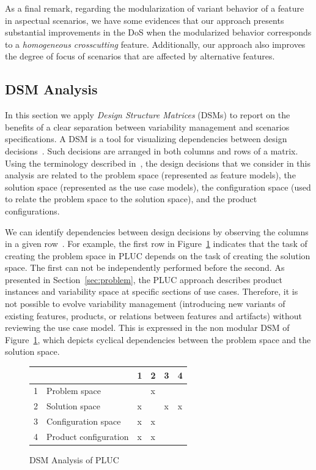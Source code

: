 \documentclass{acm_proc_article-sp}
\begin{document}
As a final remark, regarding the modularization of variant behavior of a feature
in aspectual scenarios, we have some evidences that our approach presents
substantial improvements in the DoS when the modularized behavior corresponds to
a \emph{homogeneous crosscutting} feature. Additionally, our approach also
improves the degree of focus of scenarios that are affected by alternative
features.


\subsection{DSM Analysis}

In this section we apply \emph{Design Structure Matrices} (DSMs) to report on the
benefits of a clear separation between variability management and scenarios
specifications. A DSM is a tool for visualizing dependencies between design
decisions~\cite{Baldwin:2000aa}. Such decisions are arranged in both columns and
rows of a matrix. Using the terminology described in~\cite{Czarnecki:2000aa}, the
design decisions that we consider in this analysis are related to the problem
space (represented as feature models), the solution space (represented as the use
case models), the configuration space (used to relate the problem space to the
solution space), and the product configurations.


 We can identify dependencies between design decisions by observing the columns
 in a given row~\cite{Baldwin:2000aa}. For example, the first row in
 Figure~\ref{dsm:pluc} indicates that the task of creating the problem space in
 PLUC depends on the task of creating the solution space. The first can not be
 independently performed before the second. As presented in
 Section~\ref{sec:problem}, the PLUC approach describes product instances and
 variability space at specific sections of use cases. Therefore, it is not
 possible to evolve variability management (introducing new variants of existing
 features, products, or relations between features and artifacts) without
 reviewing the use case model. This is expressed in the non modular DSM of
 Figure~\ref{dsm:pluc}, which depicts cyclical dependencies between the problem
 space and the solution space.


\begin{figure}[htb]
\centering
\begin{small}
\begin{tabular}{llllll} \hline
  &                         & 1 & 2 & 3 & 4 \\ \hline
1 & Problem space           &   & x &   &   \\
2 & Solution space          & x &   & x & x \\
3 & Configuration space     & x & x &   &   \\
4 & Product configuration   & x & x &   &   \\ \hline
\end{tabular}
\end{small}
\caption{DSM Analysis of PLUC}
\label{dsm:pluc}
\end{figure}
\end{document}
